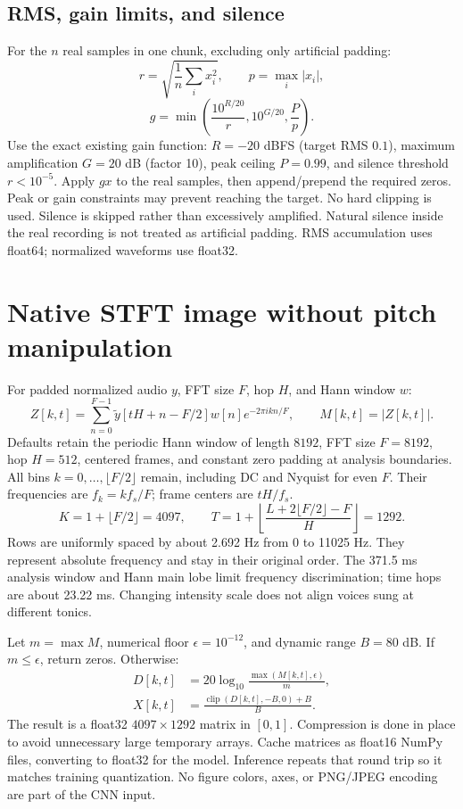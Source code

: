 \documentclass[11pt,a4paper]{article}
\begin{document}
\subsection{RMS, gain limits, and silence}
For the $n$ real samples in one chunk, excluding only artificial padding:
\[
r=\sqrt{\frac1n\sum_i x_i^2},\qquad p=\max_i|x_i|,
\]
\[
g=\min\left(\frac{10^{R/20}}r,10^{G/20},\frac{P}p\right).
\]
Use the exact existing gain function: $R=-20$ dBFS (target RMS $0.1$), maximum
amplification $G=20$ dB (factor 10), peak ceiling $P=0.99$, and silence threshold
$r<10^{-5}$. Apply $gx$ to the real samples, then append/prepend the required
zeros. Peak or gain constraints may prevent reaching the target. No hard clipping
is used. Silence is skipped rather than excessively amplified. Natural silence
inside the real recording is not treated as artificial padding. RMS accumulation
uses float64; normalized waveforms use float32.

\section{Native STFT image without pitch manipulation}
For padded normalized audio $y$, FFT size $F$, hop $H$, and Hann window $w$:
\[
Z[k,t]=\sum_{n=0}^{F-1}\widetilde y[tH+n-F/2]w[n]e^{-2\pi i kn/F},\qquad
M[k,t]=|Z[k,t]|.
\]
Defaults retain the periodic Hann window of length $8192$, FFT size $F=8192$,
hop $H=512$, centered frames, and constant zero padding at analysis boundaries.
All bins $k=0,\ldots,\lfloor F/2\rfloor$ remain, including DC and Nyquist for even
$F$. Their frequencies are $f_k=kf_s/F$; frame centers are $tH/f_s$.
\[
K=1+\lfloor F/2\rfloor=4097,\qquad
T=1+\left\lfloor\frac{L+2\lfloor F/2\rfloor-F}{H}\right\rfloor=1292.
\]
Rows are uniformly spaced by about 2.692 Hz from 0 to 11025 Hz. They represent
absolute frequency and stay in their original order. The 371.5 ms analysis window
and Hann main lobe limit frequency discrimination; time hops are about 23.22 ms.
Changing intensity scale does not align voices sung at different tonics.

Let $m=\max M$, numerical floor $\epsilon=10^{-12}$, and dynamic range $B=80$ dB.
If $m\le\epsilon$, return zeros. Otherwise:
\begin{align*}
D[k,t]&=20\log_{10}\frac{\max(M[k,t],\epsilon)}m,\\
X[k,t]&=\frac{\operatorname{clip}(D[k,t],-B,0)+B}{B}.
\end{align*}
The result is a float32 $4097\times1292$ matrix in $[0,1]$. Compression is done
in place to avoid unnecessary large temporary arrays. Cache matrices as float16
NumPy files, converting to float32 for the model. Inference repeats that round trip
so it matches training quantization. No figure colors, axes, or PNG/JPEG encoding
are part of the CNN input.
\end{document}
